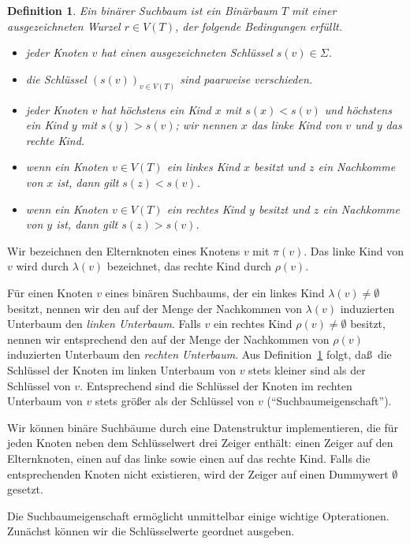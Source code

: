 \documentclass[10pt,reqno]{amsart}
\numberwithin{equation}{section}
\newtheorem{definition}{Definition}[section]
\newcommand\Def{Definition}
\begin{document}
\begin{definition}\label{def_binary_tree}
	Ein \emph{bin\"arer Suchbaum} ist ein Bin\"arbaum $T$ mit einer ausgezeichneten \emph{Wurzel} $r\in V(T)$, der folgende Bedingungen erf\"ullt.
	\begin{itemize}
		\item jeder Knoten $v$ hat einen ausgezeichneten Schl\"ussel $s(v)\in\Sigma$.
		\item die Schl\"ussel $(s(v))_{v\in V(T)}$ sind paarweise verschieden.
		\item jeder Knoten $v$ hat h\"ochstens ein Kind $x$ mit $s(x)<s(v)$ und h\"ochstens ein Kind $y$ mit $s(y)>s(v)$; wir nennen $x$ das \emph{linke Kind} von $v$ und $y$ das \emph{rechte Kind}.
		\item wenn ein Knoten $v\in V(T)$ ein linkes Kind $x$ besitzt und $z$ ein Nachkomme von $x$ ist, dann gilt $s(z)<s(v)$.
		\item wenn ein Knoten $v\in V(T)$ ein rechtes Kind $y$ besitzt und $z$ ein Nachkomme von $y$ ist, dann gilt $s(z)>s(v)$.
	\end{itemize}
\end{definition}

Wir bezeichnen den Elternknoten eines Knotens $v$ mit $\pi(v)$.
Das linke Kind von $v$ wird durch $\lambda(v)$ bezeichnet, das rechte Kind durch $\rho(v)$.

F\"ur einen Knoten $v$ eines bin\"aren Suchbaums, der ein linkes Kind $\lambda(v)\neq\emptyset$ besitzt, nennen wir den auf der Menge der Nachkommen von $\lambda(v)$ induzierten Unterbaum den \emph{linken Unterbaum}.
Falls $v$ ein rechtes Kind $\rho(v)\neq\emptyset$ besitzt, nennen wir entsprechend den auf der Menge der Nachkommen von $\rho(v)$ induzierten Unterbaum den \emph{rechten Unterbaum}.
Aus \Def~\ref{def_binary_tree} folgt, da\ss\ die Schl\"ussel der Knoten im linken Unterbaum von $v$ stets kleiner sind als der Schl\"ussel von $v$.
Entsprechend sind die Schl\"ussel der Knoten im rechten Unterbaum von $v$ stets gr\"o\ss er als der Schl\"ussel von $v$ (``Suchbaumeigenschaft'').

Wir k\"onnen bin\"are Suchb\"aume durch eine Datenstruktur implementieren, die f\"ur jeden Knoten neben dem Schl\"usselwert drei Zeiger enth\"alt: einen Zeiger auf den Elternknoten, einen auf das linke sowie einen auf das rechte Kind.
Falls die entsprechenden Knoten nicht existieren, wird der Zeiger auf einen Dummywert $\emptyset$ gesetzt.

Die Suchbaumeigenschaft erm\"oglicht unmittelbar einige wichtige Opterationen.
Zun\"achst k\"onnen wir die Schl\"usselwerte geordnet ausgeben.
\end{document}
